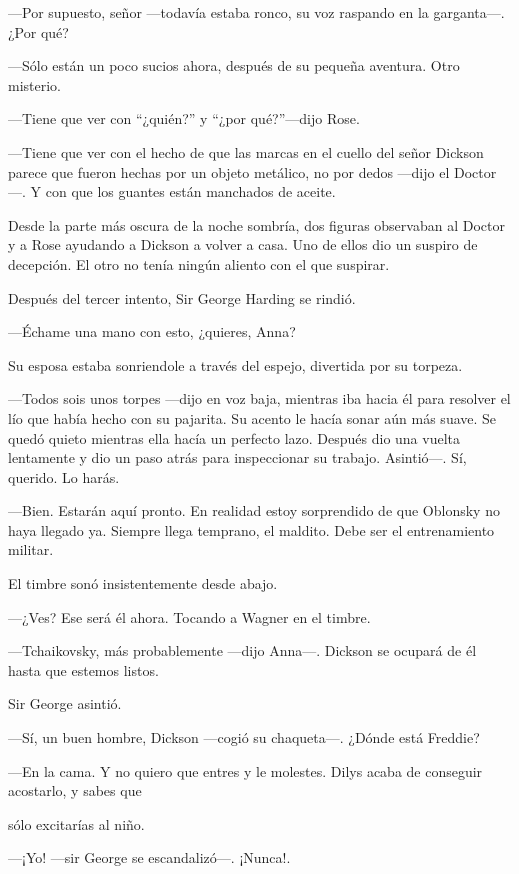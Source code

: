 {---Por supuesto, señor ---todavía estaba ronco, su voz raspando en la
garganta---. ¿Por qué?}

{---Sólo están un poco sucios ahora, después de su pequeña aventura.
Otro misterio.}

{---Tiene que ver con ``¿quién?'' y ``¿por qué?''}{---dijo Rose.}

{---Tiene que ver con el hecho de que las marcas en el cuello del señor
Dickson parece que fueron hechas por un objeto metálico, no por dedos
---dijo el Doctor---. Y con que los guantes están manchados de aceite.}

{Desde la parte más oscura de la noche sombría, dos figuras observaban
al Doctor y a Rose ayudando a Dickson a volver a casa. Uno de ellos dio
un suspiro de decepción. El otro no tenía ningún aliento con el que
suspirar.}

\mbox{}

{Después del tercer intento, Sir George Harding se rindió.}

{---Échame una mano con esto, ¿quieres, Anna?}

{Su esposa estaba sonriendole a través del espejo, divertida por su
torpeza.}

{---Todos sois unos torpes ---dijo en voz baja, mientras iba hacia él
para resolver el lío que había hecho con su pajarita. Su acento le hacía
sonar aún más suave. Se quedó quieto mientras ella hacía un perfecto
lazo. Después dio una vuelta lentamente y dio un paso atrás para
inspeccionar su trabajo. Asintió---. Sí, querido. Lo harás.}

{---Bien. Estarán aquí pronto. En realidad estoy sorprendido de que
Oblonsky no haya llegado ya. Siempre llega temprano, el maldito. Debe
ser el entrenamiento militar.}

{El timbre sonó insistentemente desde abajo.}

{---¿Ves? Ese será él ahora. Tocando a Wagner en el timbre.}

{---Tchaikovsky, más probablemente ---dijo Anna---. Dickson se ocupará
de él hasta que estemos listos.}

{Sir George asintió.}

{---Sí, un buen hombre, Dickson ---cogió su chaqueta---. ¿Dónde está
Freddie?}

{---En la cama. Y no quiero que entres y le molestes. Dilys acaba de
conseguir acostarlo, y sabes que}

{sólo excitarías al niño.}

{---¡Yo! ---sir George se escandalizó---. ¡Nunca!.}

